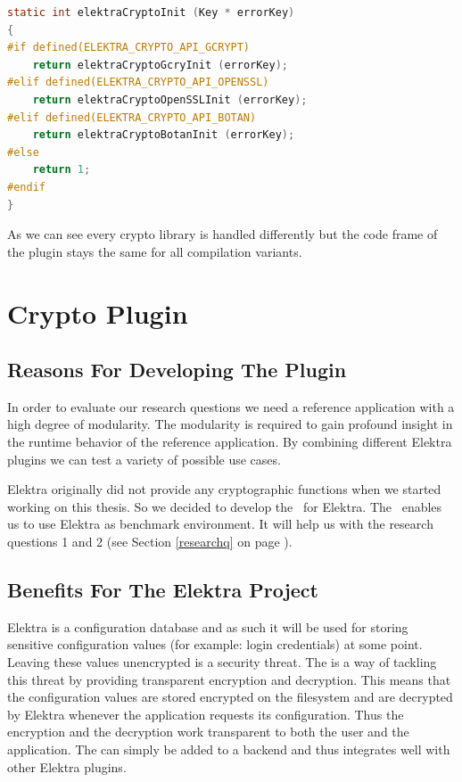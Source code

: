 \begin{lstlisting}[label=impl-cryptoInit,language=C,caption={Example of how to use compilation variants in Elektra}]
static int elektraCryptoInit (Key * errorKey)
{
#if defined(ELEKTRA_CRYPTO_API_GCRYPT)
	return elektraCryptoGcryInit (errorKey);
#elif defined(ELEKTRA_CRYPTO_API_OPENSSL)
	return elektraCryptoOpenSSLInit (errorKey);
#elif defined(ELEKTRA_CRYPTO_API_BOTAN)
	return elektraCryptoBotanInit (errorKey);
#else
	return 1;
#endif
}
\end{lstlisting}

As we can see every crypto library is handled differently but the code frame of the plugin stays the same for all compilation variants.

\section{Crypto Plugin}\label{crypto-plugin}

\subsection{Reasons For Developing The Plugin}

In order to evaluate our research questions we need a reference application with a high degree of modularity.
The modularity is required to gain profound insight in the runtime behavior of the reference application.
By combining different Elektra plugins we can test a variety of possible use cases.

Elektra originally did not provide any cryptographic functions when we started working on this thesis.
So we decided to develop the \crypto ~for Elektra.
The \crypto ~enables us to use Elektra as benchmark environment.
It will help us with the research questions 1 and 2 (see Section \ref{researchq} on page \pageref{researchq}).

\subsection{Benefits For The Elektra Project}

Elektra is a configuration database and as such it will be used for storing sensitive configuration values (for example: login credentials) at some point.
Leaving these values unencrypted is a security threat.
The \crypto{} is a way of tackling this threat by providing transparent encryption and decryption.
This means that the configuration values are stored encrypted on the filesystem and are decrypted by Elektra whenever the application requests its configuration.
Thus the encryption and the decryption work transparent to both the user and the application.
The \crypto{} can simply be added to a backend and thus integrates well with other Elektra plugins.

